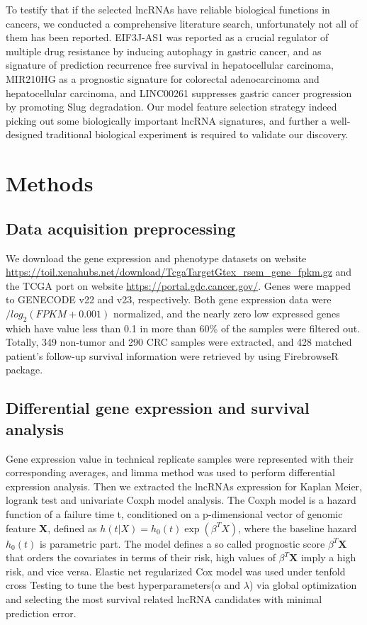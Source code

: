 \documentclass[fleqn,10pt]{wlscirep}
\begin{document}
To testify that if the selected lncRNAs have reliable biological functions in cancers, we conducted a comprehensive literature search, unfortunately not all of them has been reported. EIF3J-AS1 was reported as a crucial regulator of multiple drug resistance by inducing autophagy in gastric cancer\cite{RN21}, and as signature of prediction recurrence free survival in hepatocellular carcinoma\cite{RN22}, MIR210HG as a prognostic signature for colorectal adenocarcinoma and hepatocellular carcinoma\cite{RN23,RN24}, and LINC00261 suppresses gastric cancer progression by promoting Slug degradation\cite{RN25}. Our model feature selection strategy indeed picking out some biologically important lncRNA signatures, and further a well-designed traditional biological experiment is required to validate our discovery.

\section*{Methods}

\subsection*{Data acquisition preprocessing}
We download the gene expression and phenotype datasets on website \url{https://toil.xenahubs.net/download/TcgaTargetGtex_rsem_gene_fpkm.gz} and the TCGA port on website \url{https://portal.gdc.cancer.gov/}. Genes were mapped to GENECODE v22 and v23, respectively. Both gene expression data were $/log_{2}(FPKM+0.001)$ normalized, and the nearly zero low expressed genes which have value less than 0.1 in more than 60\% of the samples were filtered out. Totally, 349 non-tumor and 290 CRC samples were extracted, and 428 matched patient’s follow-up survival information were retrieved by using FirebrowseR package\cite{RN26}.

\subsection*{Differential gene expression and survival analysis}
Gene expression value in technical replicate samples were represented with their corresponding averages, and limma method  was used to perform differential expression analysis\cite{RN27}. Then we extracted the lncRNAs expression for Kaplan Meier, logrank test and univariate Coxph model analysis. The Coxph model is a hazard function of a failure time t, conditioned on a p-dimensional vector of genomic feature \textbf X, defined as $h(t | X)=h_{0}(t) \exp \left(\beta^{T} X\right)$, where the baseline hazard $h_{0}(t)$ is parametric part. The model defines a so called prognostic score $\beta^{T}\mathbf X$ that orders the covariates in terms of their risk, high values of $\beta^{T}\mathbf X$ imply a high risk, and vice versa.
Elastic net regularized Cox model was used under tenfold cross Testing to tune the best hyperparameters($\alpha$ and $\lambda$) via global optimization \cite{RN28,RN29} and selecting the most survival related lncRNA candidates with minimal prediction error.
\end{document}
